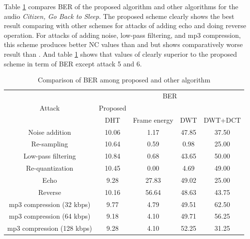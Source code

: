 \documentclass[12pt,a4paper]{report}
\begin{document}
Table \ref{table:comparisonBER} compares BER of the proposed algorithm and other algorithms for the audio \textit{Citizen, Go Back to Sleep}. The proposed scheme clearly shows the best result comparing with other schemes for attacks of adding echo and doing reverse operation. For attacks of adding noise, low-pass filtering, and mp3 compression, this scheme produces better NC values than \cite{dwt} and \cite{ieee} but shows comparatively worse result than \cite{energy}. And table \ref{table:comparisonBER} shows that values of \cite{energy} clearly superior to the proposed scheme in term of BER except attack 5 and 6.

\begin{table}[h!]
 \centering
 \begin{tabular}{|c|c|c|c|c|} 
 \hline
 \multirow{3}{*}{Attack} & \multicolumn{4}{|c|}{BER} \\
 \cline{2-5}
 & Proposed & \cite{energy} & \cite{dwt} & \cite{ieee} \\ 
 \cline{2-5}
 & DHT & Frame energy & DWT & DWT+DCT \\
 \hline
 Noise addition & 10.06 & 1.17 & 47.85 & 37.50 \\ 
  \hline
Re-sampling & 10.64 & 0.59 & 0.98 & 25.00 \\ 
 \hline
Low-pass filtering & 10.84 & 0.68 & 43.65 & 50.00 \\ 
 \hline
Re-quantization & 10.45 & 0.00 & 4.69 & 49.00 \\ 
 \hline
Echo & 9.28 & 27.83 & 49.02 & 25.00 \\ 
 \hline
Reverse & 10.16 & 56.64 & 48.63 & 43.75 \\ 
 \hline
mp3 compression (32 kbps) & 9.77 & 4.79 & 49.51 & 62.50 \\ 
 \hline
mp3 compression (64 kbps) & 9.18 & 4.10 & 49.71 & 56.25 \\ 
 \hline
mp3 compression (128 kbps) & 9.28 & 4.10 & 52.25 & 31.25 \\ 
 \hline
 \end{tabular}
 \newline
 \caption{Comparison of BER among proposed and other algorithm}
 \label{table:comparisonBER}
\end{table}

\newpage
\end{document}
